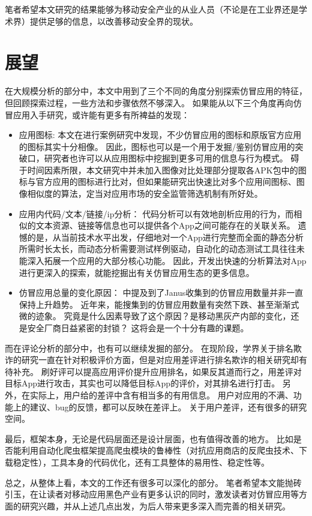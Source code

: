 笔者希望本文研究的结果能够为移动安全产业的从业人员（不论是在工业界还是学术界）提供足够的信息，以改善移动安全界的现状。

\section{展望}

在大规模分析的部分中，本文中用到了三个不同的角度分别探索仿冒应用的特征，但回顾探索过程，一些方法和步骤依然不够深入。
如果能从以下三个角度再向仿冒应用入手研究，或许能有更多有所裨益的发现：

\begin{itemize}
    \item 应用图标:
    本文在进行案例研究中发现，不少仿冒应用的图标和原版官方应用的图标其实十分相像。
    因此，图标也可以是一个用于发掘/鉴别仿冒应用的突破口，研究者也许可以从应用图标中挖掘到更多可用的信息与行为模式。
    碍于时间因素所限，本文研究中并未加入图像对比处理部分提取各APK包中的图标与官方应用的图标进行比对，但如果能研究出快速比对多个应用间图标、图像相似度的算法，定当对应用市场的安全监管筛选机制有所好处。

    \item 应用内代码/文本/链接/ip分析：
    代码分析可以有效地剖析应用的行为，而相似的文本资源、链接等信息也可以提供各个App之间可能存在的关联关系。
    遗憾的是，从当前技术水平出发，仔细地对一个App进行完整而全面的静态分析所需时长太长，而动态分析需要测试样例驱动，自动化的动态测试工具往往未能深入拓展一个应用的大部分核心功能。
    因此，开发出快速的分析算法对App进行更深入的探索，就能挖掘出有关仿冒应用生态的更多信息。

    \item 仿冒应用总量的变化原因：
    中提及到了Janus收集到的仿冒应用数量并非一直保持上升趋势。
    近年来，能搜集到的仿冒应用数量有突然下跌、甚至渐渐式微的迹象。
    究竟是什么因素导致了这个原因？是移动黑灰产内部的变化，还是安全厂商日益紧密的封锁？
    这将会是一个十分有趣的课题。
\end{itemize}

而在评论分析的部分中，也有可以继续发掘的部分。
在现阶段，学界关于排名欺诈的研究一直在针对积极评价方面，但是对应用差评进行排名欺诈的相关研究却有待补充。
刷好评可以提高应用评价提升应用排名，如果反其道而行之，用差评对目标App进行攻击，其实也可以降低目标App的评价，对其排名进行打击。
另外，在实际上，用户给的差评中含有相当多的有用信息。
用户对应用的不满、功能上的建议、bug的反馈，都可以反映在差评上。
关于用户差评，还有很多的研究空间。

最后，\mytool 框架本身，无论是代码层面还是设计层面，也有值得改善的地方。
比如是否能利用自动化爬虫框架提高爬虫模块的鲁棒性（对抗应用商店的反爬虫技术、下载稳定性），工具本身的代码优化，还有工具整体的易用性、稳定性等。

总之，从整体上看，本文的工作还有很多可以深化的部分。
笔者希望本文能抛砖引玉，在让读者对移动应用黑色产业有更多认识的同时，激发读者对仿冒应用等方面的研究兴趣，并从上述几点出发，为后人带来更多深入而完善的相关研究。
